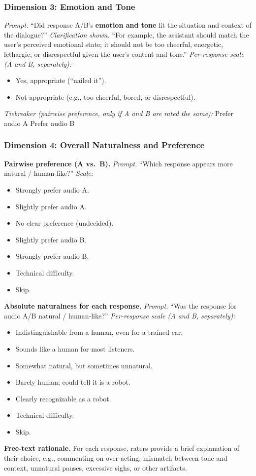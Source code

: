 \begin{tcolorbox}[gray_box, title = {{Aesthetic Naturalness Human Evaluation Rubric }}]
\subsubsection*{Dimension 3: Emotion and Tone}
\emph{Prompt.} ``Did response A/B's \textbf{emotion and tone} fit the
situation and context of the dialogue?''
\noindent\emph{Clarification shown.} ``For example, the assistant should
match the user’s perceived emotional state; it should not be too
cheerful, energetic, lethargic, or disrespectful given the user’s
content and tone.''
\noindent\emph{Per-response scale (A and B, separately):}
\begin{itemize}[leftmargin=1.2em, nosep]
  \item[1] Yes, appropriate (``nailed it'').
  \item[0] Not appropriate (e.g., too cheerful, bored, or disrespectful).
\end{itemize}
\noindent\emph{Tiebreaker (pairwise preference, only if A and B are rated the same):}  Prefer audio A  Prefer audio B
\subsubsection*{Dimension 4: Overall Naturalness and Preference}
\textbf{Pairwise preference (A vs.\ B).}
\emph{Prompt.} ``Which response appears more natural / human-like?''
\noindent\emph{Scale:}
\begin{itemize}[leftmargin=1.2em, nosep]
  \item[1] Strongly prefer audio A.
  \item[2] Slightly prefer audio A.
  \item[3] No clear preference (undecided).
  \item[4] Slightly prefer audio B.
  \item[5] Strongly prefer audio B.
  \item[X] Technical difficulty.
  \item[X] Skip.
\end{itemize}
\textbf{Absolute naturalness for each response.}
\emph{Prompt.} ``Was the response for audio A/B natural / human-like?''
\noindent\emph{Per-response scale (A and B, separately):}
\begin{itemize}[leftmargin=1.2em, nosep]
  \item[5] Indistinguishable from a human, even for a trained ear.
  \item[4] Sounds like a human for most listeners.
  \item[3] Somewhat natural, but sometimes unnatural.
  \item[2] Barely human; could tell it is a robot.
  \item[1] Clearly recognizable as a robot.
  \item[X] Technical difficulty.
  \item[X] Skip.
\end{itemize}
\textbf{Free-text rationale.}
For each response, raters provide a brief explanation of their choice,
e.g., commenting on over-acting, mismatch between tone and context,
unnatural pauses, excessive sighs, or other artifacts.
\end{tcolorbox}